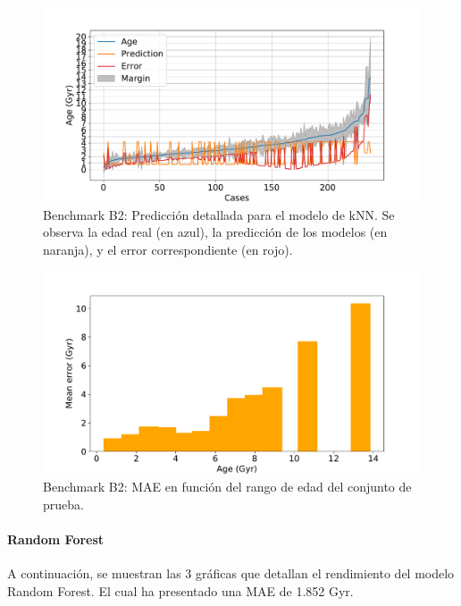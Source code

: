 \begin{figure}[H]
\begin{center}
 \includegraphics[width=0.8\linewidth]{Figuras/Experimentos/B_B2_knn_2.pdf}
\end{center}
\caption{Benchmark B2: Predicción detallada para el modelo de kNN. Se observa la edad real (en azul), la predicción de los modelos (en naranja), y el error correspondiente (en rojo).}
 \label{fig:benchB2_details_knn_2}
\end{figure}

\begin{figure}[H]
\begin{center}
 \includegraphics[width=0.8\linewidth]{Figuras/Experimentos/B_B2_knn_3.pdf}
\end{center}
\caption{Benchmark B2: MAE en función del rango de edad del conjunto de prueba.}
 \label{fig:benchB2_details_knn_3}
\end{figure}

\paragraph{Random Forest} 
A continuación, se muestran las 3 gráficas que detallan el rendimiento del modelo Random Forest. El cual ha presentado una MAE de 1.852 Gyr.

